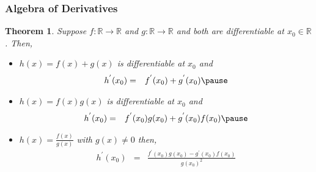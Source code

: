\documentclass{beamer}
\newtheorem{thm}{Theorem}
\numberwithin{equation}{section}
\begin{document}
\begin{frame}
\frametitle{Algebra of Derivatives}

\begin{thm} Suppose $f:\mathbb{R} \rightarrow \mathbb{R}$ and $g:\mathbb{R} \rightarrow \mathbb{R}$ and both are differentiable at $x_{0} \in \mathbb{R}$.  Then, \pause 
\begin{itemize}
\item[i)] $h(x) = f(x) + g(x)$ is differentiable at $x_{0}$ and \pause 
\begin{eqnarray}
h^{'} (x_{0}) & = & f^{'}(x_{0}) + g^{'} (x_{0}) \nonumber \pause 
\end{eqnarray}
\item[ii)] $h(x) = f(x) g(x) $ is differentiable at $x_{0}$ and \pause 
\begin{eqnarray}
h^{'}(x_{0}) & = & f^{'}(x_{0}) g(x_{0}) + g^{'}(x_{0}) f(x_{0}) \nonumber  \pause 
\end{eqnarray}
\item[iii)] $h(x)  = \frac{f(x) }{g(x) }$ with $g(x) \neq 0$ then, \pause 
\begin{eqnarray}
h^{'}(x_{0}) & = &  \frac{f^{'}(x_{0}) g(x_{0}) - g^{'}(x_{0}) f(x_{0})} {g(x_{0})^2} \nonumber
\end{eqnarray}
\end{itemize}
\end{thm}

\end{frame}
\end{document}
